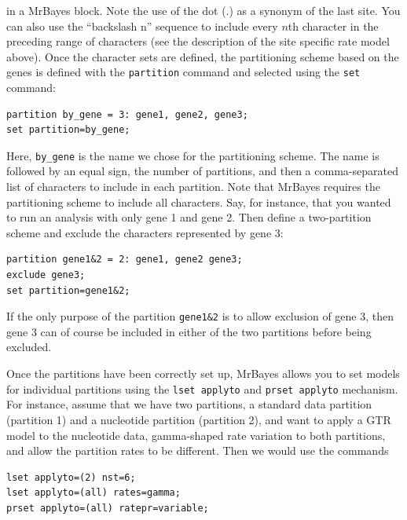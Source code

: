 \documentclass[12pt]{book}
\newcommand{\ttt}[1]{\texttt{#1} }
\begin{document}
in a MrBayes block. Note the use of the dot (.) as a synonym of the last site. You can also
use the “backslash n” sequence to include every $n$th character in the preceding range of
characters (see the description of the site specific rate model above). Once the character
sets are defined, the partitioning scheme based on the genes is defined with the
\ttt{partition} command and selected using the \ttt{set} command:

\begin{singlespacing}
\small
\begin{verbatim}
partition by_gene = 3: gene1, gene2, gene3;
set partition=by_gene;
\end{verbatim}
\normalsize
\end{singlespacing}

Here, \ttt{by\_gene} is the name we chose for the partitioning scheme. The name is followed
by an equal sign, the number of partitions, and then a comma-separated list of characters
to include in each partition. Note that MrBayes requires the partitioning scheme to
include all characters. Say, for instance, that you wanted to run an analysis with only
gene 1 and gene 2. Then define a two-partition scheme and exclude the characters
represented by gene 3:

\begin{singlespacing}
\small
\begin{verbatim}
partition gene1&2 = 2: gene1, gene2 gene3;
exclude gene3;
set partition=gene1&2;
\end{verbatim}
\normalsize
\end{singlespacing}

If the only purpose of the partition \ttt{gene1\&2} is to allow exclusion of gene 3, then gene 3
can of course be included in either of the two partitions before being excluded.

Once the partitions have been correctly set up, MrBayes allows you to set models for
individual partitions using the \ttt{lset applyto} and \ttt{prset applyto} mechanism. For
instance, assume that we have two partitions, a standard data partition (partition 1) and a
nucleotide partition (partition 2), and want to apply a GTR model to the nucleotide data,
gamma-shaped rate variation to both partitions, and allow the partition rates to be
different. Then we would use the commands

\begin{singlespacing}
\small
\begin{verbatim}
lset applyto=(2) nst=6;
lset applyto=(all) rates=gamma;
prset applyto=(all) ratepr=variable;
\end{verbatim}
\normalsize
\end{singlespacing}
\end{document}
